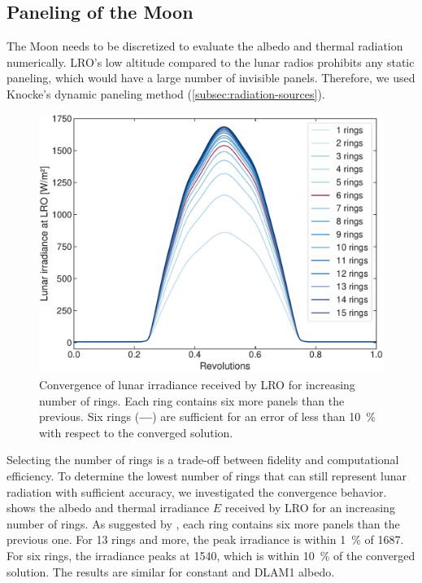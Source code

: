 \subsection{Paneling of the Moon}

The Moon needs to be discretized to evaluate the albedo and thermal radiation numerically. \gls{LRO}'s low altitude compared to the lunar radios prohibits any static paneling, which would have a large number of invisible panels. Therefore, we used Knocke's dynamic paneling method (\cref{subsec:radiation-sources}).

\begin{figure}[t]
    \centering
    \includegraphics[width=\linewidth]{figures/plots/paneling_convergence.pdf}
    \caption{Convergence of lunar irradiance received by \gls{LRO} for increasing number of rings. Each ring contains six more panels than the previous. Six rings (\textcolor{mpl-red}{\textbf{---}}) are sufficient for an error of less than \qty{10}{\percent} with respect to the converged solution.}
    \label{fig:paneling-convergence}
\end{figure}

Selecting the number of rings is a trade-off between fidelity and computational efficiency. To determine the lowest number of rings that can still represent lunar radiation with sufficient accuracy, we investigated the convergence behavior.  shows the albedo and thermal irradiance $E$ received by \gls{LRO} for an increasing number of rings. As suggested by \citeauthor{Knocke1988}, each ring contains six more panels than the previous one. For 13 rings and more, the peak irradiance is within \qty{1}{\percent} of \qty{1687}{\irr}. For six rings, the irradiance peaks at \qty{1540}{\irr}, which is within \qty{10}{\percent} of the converged solution. The results are similar for constant and \gls{DLAM1} albedo.


